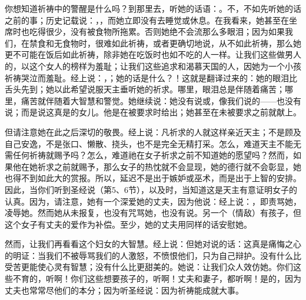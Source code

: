 你想知道祈祷中的警醒是什么吗？到那里去，听她的话语：。不，不如先听她的话之前的事；历史记载说：，，而她立即没有去睡觉或休息。在我看来，她甚至在坐席时也吃得很少，没有被食物所拖累。否则她绝不会流那么多眼泪；因为如果我们，在禁食和无食物时，很难如此祈祷，或者更确切地说，从不如此祈祷，那么她更不可能在饭后如此祈祷，除非她在吃饭时也如不吃的人一样。让我们这些做男人的，以这个女人的榜样为羞耻；让我们这些追求和渴慕天国的人，因她为一个小孩祈祷哭泣而羞耻。经上说：，；她的话是什么？！这就是翻译过来的：她的眼泪比舌头先到；她以此希望说服天主垂听她的祈求。哪里，眼泪总是伴随着痛苦；哪里，痛苦就伴随着大智慧和警觉。她继续说：她没有说或，像我们说的——也没有说；而是说这真是的女儿。他是在被要求时给出；她甚至在未被要求之前就献上。\par

但请注意她在此之后深切的敬畏。经上说：凡祈求的人就这样亲近天主；不是顾及自己安逸，不是张口、懒散、挠头，也不是完全无精打采。怎么，难道天主不能无需任何祈祷就赐予吗？怎么，难道祂在女子祈求之前不知道她的愿望吗？然而，如果他在她祈求之前就赐予，那么女子的热忱就不会显现，她的德行就不会彰显，她也得不到如此大的赏报。所以，延迟不是出于嫉妒或巫术，而是出于上智的安排。因此，当你们听到圣经说（第5、6节），以及时，当知道这是天主有意证明女子的认真。因为，请注意，她有一个深爱她的丈夫，因为他说：经上说：，即责骂她，凌辱她。然而她从未报复，也没有咒骂她，也没有说。另一个（情敌）有孩子，但这个女子有丈夫的爱作为补偿。至少，她的丈夫用同样的话安慰她。\par

然而，让我们再看看这个妇女的大智慧。经上说：但她对说的话：这真是痛悔之心的明证：当我们不被辱骂我们的人激怒，不愤恨他们，只为自己辩护。没有什么比受苦更能使心灵有智慧；没有什么比更甜美的。她说：让我们众人效仿她。你们这些不育的，听啊！你们这些想要孩子的，听啊！丈夫和妻子，都听啊！是的，因为丈夫也常常尽他们的本分；因为听圣经说：因为祈祷能成就大事。\par

